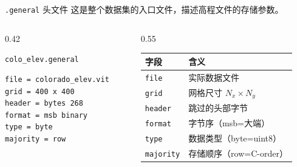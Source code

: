 \documentclass[aspectratio=169,11pt]{ctexbeamer}
\begin{document}
\begin{frame}[fragile]{\texttt{.general} 头文件}
  这是整个数据集的入口文件，描述高程文件的存储参数。

  \begin{columns}
    \begin{column}{0.42\linewidth}
      \begin{block}{\texttt{colo\_elev.general}}
\begin{Verbatim}[fontsize=\tiny]
file = colorado_elev.vit
grid = 400 x 400
header = bytes 268
format = msb binary
type = byte
majority = row
\end{Verbatim}
      \end{block}
    \end{column}
    \begin{column}{0.55\linewidth}
      \begin{table}
        \centering
        \begin{tabularx}{\linewidth}{lX}
          \toprule
          字段 & 含义 \\
          \midrule
          \texttt{file} & 实际数据文件 \\
          \texttt{grid} & 网格尺寸 $N_x\times N_y$ \\
          \texttt{header} & 跳过的头部字节 \\
          \texttt{format} & 字节序（msb=大端） \\
          \texttt{type} & 数据类型（byte=uint8） \\
          \texttt{majority} & 存储顺序（row=C-order） \\
          \bottomrule
        \end{tabularx}
      \end{table}
    \end{column}
  \end{columns}
\end{frame}
\end{document}
